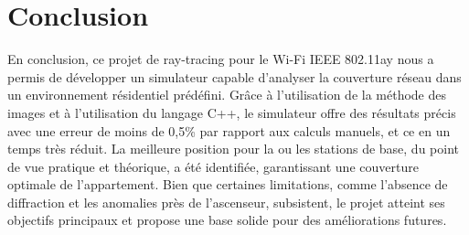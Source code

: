 \clearpage{}%
\chapter*{Conclusion}
\label{conclusion}

En conclusion, ce projet de ray-tracing pour le Wi-Fi IEEE 802.11ay nous a permis de développer un simulateur capable d'analyser la couverture réseau dans un environnement résidentiel prédéfini. Grâce à l'utilisation de la méthode des images et à l'utilisation du langage C++, le simulateur offre des résultats précis avec une erreur de moins de 0,5\% par rapport aux calculs manuels, et ce en un temps très réduit. La meilleure position pour la ou les stations de base, du point de vue pratique et théorique, a été identifiée, garantissant une couverture optimale de l'appartement. Bien que certaines limitations, comme l'absence de diffraction et les anomalies près de l'ascenseur, subsistent, le projet atteint ses objectifs principaux et propose une base solide pour des améliorations futures.
